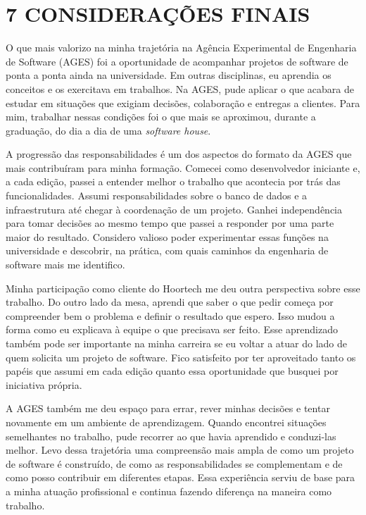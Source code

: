 \hypertarget{__RefHeading___Toc4857_3118176633}{}
\hypertarget{_Toc45627150}{}
\chapter*{7 CONSIDERAÇÕES FINAIS}
\label{ages-iv:text-h-0123}

\indent O que mais valorizo na minha trajetória na Agência Experimental de Engenharia de Software (AGES) foi a oportunidade de acompanhar projetos de software de ponta a ponta ainda na universidade. Em outras disciplinas, eu aprendia os conceitos e os exercitava em trabalhos. Na AGES, pude aplicar o que acabara de estudar em situações que exigiam decisões, colaboração e entregas a clientes. Para mim, trabalhar nessas condições foi o que mais se aproximou, durante a graduação, do dia a dia de uma \textit{software house}.\par

\indent A progressão das responsabilidades é um dos aspectos do formato da AGES que mais contribuíram para minha formação. Comecei como desenvolvedor iniciante e, a cada edição, passei a entender melhor o trabalho que acontecia por trás das funcionalidades. Assumi responsabilidades sobre o banco de dados e a infraestrutura até chegar à coordenação de um projeto. Ganhei independência para tomar decisões ao mesmo tempo que passei a responder por uma parte maior do resultado. Considero valioso poder experimentar essas funções na universidade e descobrir, na prática, com quais caminhos da engenharia de software mais me identifico.\par

\indent Minha participação como cliente do Hoortech me deu outra perspectiva sobre esse trabalho. Do outro lado da mesa, aprendi que saber o que pedir começa por compreender bem o problema e definir o resultado que espero. Isso mudou a forma como eu explicava à equipe o que precisava ser feito. Esse aprendizado também pode ser importante na minha carreira se eu voltar a atuar do lado de quem solicita um projeto de software. Fico satisfeito por ter aproveitado tanto os papéis que assumi em cada edição quanto essa oportunidade que busquei por iniciativa própria.\par

\indent A AGES também me deu espaço para errar, rever minhas decisões e tentar novamente em um ambiente de aprendizagem. Quando encontrei situações semelhantes no trabalho, pude recorrer ao que havia aprendido e conduzi-las melhor. Levo dessa trajetória uma compreensão mais ampla de como um projeto de software é construído, de como as responsabilidades se complementam e de como posso contribuir em diferentes etapas. Essa experiência serviu de base para a minha atuação profissional e continua fazendo diferença na maneira como trabalho.\par

